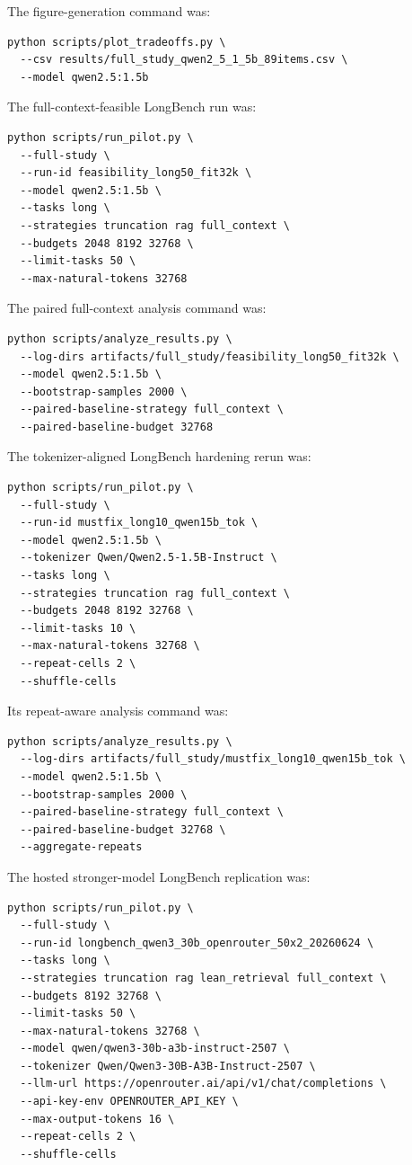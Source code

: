 \documentclass[11pt]{article}
\begin{document}
The figure-generation command was:
\begin{verbatim}
python scripts/plot_tradeoffs.py \
  --csv results/full_study_qwen2_5_1_5b_89items.csv \
  --model qwen2.5:1.5b
\end{verbatim}

The full-context-feasible LongBench run was:
\begin{verbatim}
python scripts/run_pilot.py \
  --full-study \
  --run-id feasibility_long50_fit32k \
  --model qwen2.5:1.5b \
  --tasks long \
  --strategies truncation rag full_context \
  --budgets 2048 8192 32768 \
  --limit-tasks 50 \
  --max-natural-tokens 32768
\end{verbatim}

The paired full-context analysis command was:
\begin{verbatim}
python scripts/analyze_results.py \
  --log-dirs artifacts/full_study/feasibility_long50_fit32k \
  --model qwen2.5:1.5b \
  --bootstrap-samples 2000 \
  --paired-baseline-strategy full_context \
  --paired-baseline-budget 32768
\end{verbatim}

The tokenizer-aligned LongBench hardening rerun was:
\begin{verbatim}
python scripts/run_pilot.py \
  --full-study \
  --run-id mustfix_long10_qwen15b_tok \
  --model qwen2.5:1.5b \
  --tokenizer Qwen/Qwen2.5-1.5B-Instruct \
  --tasks long \
  --strategies truncation rag full_context \
  --budgets 2048 8192 32768 \
  --limit-tasks 10 \
  --max-natural-tokens 32768 \
  --repeat-cells 2 \
  --shuffle-cells
\end{verbatim}

Its repeat-aware analysis command was:
\begin{verbatim}
python scripts/analyze_results.py \
  --log-dirs artifacts/full_study/mustfix_long10_qwen15b_tok \
  --model qwen2.5:1.5b \
  --bootstrap-samples 2000 \
  --paired-baseline-strategy full_context \
  --paired-baseline-budget 32768 \
  --aggregate-repeats
\end{verbatim}

The hosted stronger-model LongBench replication was:
\begin{verbatim}
python scripts/run_pilot.py \
  --full-study \
  --run-id longbench_qwen3_30b_openrouter_50x2_20260624 \
  --tasks long \
  --strategies truncation rag lean_retrieval full_context \
  --budgets 8192 32768 \
  --limit-tasks 50 \
  --max-natural-tokens 32768 \
  --model qwen/qwen3-30b-a3b-instruct-2507 \
  --tokenizer Qwen/Qwen3-30B-A3B-Instruct-2507 \
  --llm-url https://openrouter.ai/api/v1/chat/completions \
  --api-key-env OPENROUTER_API_KEY \
  --max-output-tokens 16 \
  --repeat-cells 2 \
  --shuffle-cells
\end{verbatim}
\end{document}

